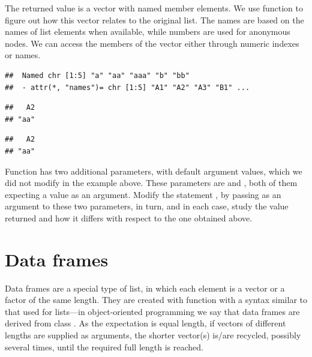 \documentclass[krantz2]{krantz}\usepackage{knitr}
\begin{document}
The returned value is a vector with named member elements. We use function  to figure out how this vector relates to the original list. The names are based on the names of list elements when available, while numbers are used for anonymous nodes. We can access the members of the vector either through numeric indexes or names.

\begin{knitrout}\footnotesize
{}\color{fgcolor}\begin{kframe}
\begin{alltt}
\end{alltt}
\begin{verbatim}
##  Named chr [1:5] "a" "aa" "aaa" "b" "bb"
##  - attr(*, "names")= chr [1:5] "A1" "A2" "A3" "B1" ...
\end{verbatim}
\begin{alltt}
\hlstd{c.vec[}\hlstd{]}
\end{alltt}
\begin{verbatim}
##   A2 
## "aa"
\end{verbatim}
\begin{alltt}
\hlstd{c.vec[}\hlstd{]}
\end{alltt}
\begin{verbatim}
##   A2 
## "aa"
\end{verbatim}
\end{kframe}
\end{knitrout}

\begin{playground}
Function  has two additional parameters, with default argument values, which we did not modify in the example above. These parameters are  and , both of them expecting a  value as an argument. Modify the statement , by passing  as an argument to these two parameters, in turn, and in each case, study the value returned and how it differs with respect to the one obtained above.
\end{playground}



\section{Data frames}\label{sec:R:data:frames}
Data frames are a special type of list, in which each element is a vector or a factor of the same length. They are created with function  with a syntax similar to that used for lists---in object-oriented programming we say that data frames are derived from class . As the expectation is equal length, if vectors of different lengths are supplied as arguments, the shorter vector(s) is/are recycled, possibly several times, until the required full length is reached.
\end{document}
